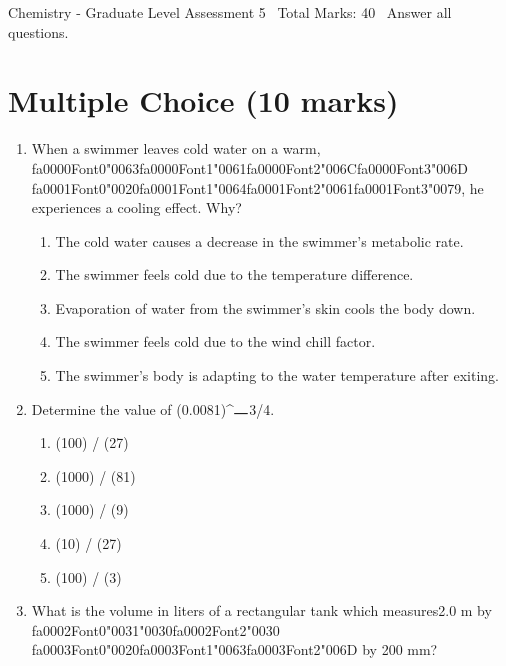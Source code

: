 \documentclass[12pt]{article}
\begin{document}
\begin{center}
Chemistry - Graduate Level Assessment 5 \
Total Marks: 40 \
Answer all questions.
\end{center}

\section*{Multiple Choice (10 marks)}
\begin{enumerate}[label=\arabic*.]
\item When a swimmer leaves cold water on a warm, {\csname fa0000Font0\endcsname\char"0063}{\csname fa0000Font1\endcsname\char"0061}{\csname fa0000Font2\endcsname\char"006C}{\csname fa0000Font3\endcsname\char"006D} {\csname fa0001Font0\endcsname\char"0020}{\csname fa0001Font1\endcsname\char"0064}{\csname fa0001Font2\endcsname\char"0061}{\csname fa0001Font3\endcsname\char"0079}, he experiences a cooling effect.
Why?
\begin{enumerate}[label=(\alph*)]
    \item The cold water causes a decrease in the swimmer's metabolic rate.
    \item The swimmer feels cold due to the temperature difference.
    \item Evaporation of water from the swimmer's skin cools the body down.
    \item The swimmer feels cold due to the wind chill factor.
    \item The swimmer's body is adapting to the water temperature after exiting.
\end{enumerate}
\item Determine the value of (0.0081)\^{}\ensuremath{\rule{1em}{1pt}}3/4.
\begin{enumerate}[label=(\alph*)]
    \item (100) / (27)
    \item (1000) / (81)
    \item (1000) / (9)
    \item (10) / (27)
    \item (100) / (3)
\end{enumerate}
\item What is the volume in liters of a rectangular tank which measures2.0 m by {\csname fa0002Font0\endcsname\char"0031}{\char"0030}{\csname fa0002Font2\endcsname\char"0030} {\csname fa0003Font0\endcsname\char"0020}{\csname fa0003Font1\endcsname\char"0063}{\csname fa0003Font2\endcsname\char"006D} by 200 mm?
\begin{enumerate}[label=(\alph*)]

\end{enumerate}
\end{enumerate}
\end{document}
